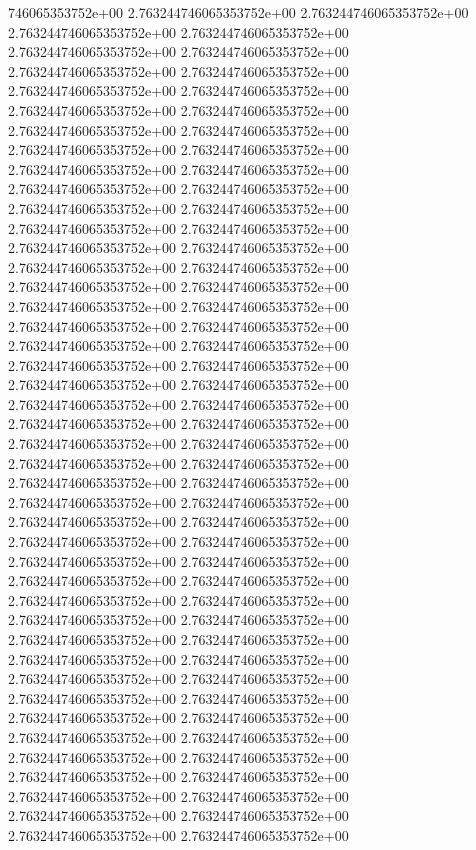 746065353752e+00	2.763244746065353752e+00	2.763244746065353752e+00	2.763244746065353752e+00	2.763244746065353752e+00	2.763244746065353752e+00	2.763244746065353752e+00	2.763244746065353752e+00	2.763244746065353752e+00	2.763244746065353752e+00	2.763244746065353752e+00	2.763244746065353752e+00	2.763244746065353752e+00	2.763244746065353752e+00	2.763244746065353752e+00	2.763244746065353752e+00	2.763244746065353752e+00	2.763244746065353752e+00	2.763244746065353752e+00	2.763244746065353752e+00	2.763244746065353752e+00	2.763244746065353752e+00	2.763244746065353752e+00	2.763244746065353752e+00	2.763244746065353752e+00	2.763244746065353752e+00	2.763244746065353752e+00	2.763244746065353752e+00	2.763244746065353752e+00	2.763244746065353752e+00	2.763244746065353752e+00	2.763244746065353752e+00	2.763244746065353752e+00	2.763244746065353752e+00	2.763244746065353752e+00	2.763244746065353752e+00	2.763244746065353752e+00	2.763244746065353752e+00	2.763244746065353752e+00	2.763244746065353752e+00	2.763244746065353752e+00	2.763244746065353752e+00	2.763244746065353752e+00	2.763244746065353752e+00	2.763244746065353752e+00	2.763244746065353752e+00	2.763244746065353752e+00	2.763244746065353752e+00	2.763244746065353752e+00	2.763244746065353752e+00	2.763244746065353752e+00	2.763244746065353752e+00	2.763244746065353752e+00	2.763244746065353752e+00	2.763244746065353752e+00	2.763244746065353752e+00	2.763244746065353752e+00	2.763244746065353752e+00	2.763244746065353752e+00	2.763244746065353752e+00	2.763244746065353752e+00	2.763244746065353752e+00	2.763244746065353752e+00	2.763244746065353752e+00	2.763244746065353752e+00	2.763244746065353752e+00	2.763244746065353752e+00	2.763244746065353752e+00	2.763244746065353752e+00	2.763244746065353752e+00	2.763244746065353752e+00	2.763244746065353752e+00	2.763244746065353752e+00	2.763244746065353752e+00	2.763244746065353752e+00	2.763244746065353752e+00	2.763244746065353752e+00	2.763244746065353752e+00	2.763244746065353752e+00	2.763244746065353752e+00	2.763244746065353752e+00	2.763244746065353752e+00	2.763244746065353752e+00	2.763244746065353752e+00	2.763244746065353752e+00	2.763244746065353752e+00	2.763244746065353752e+00
